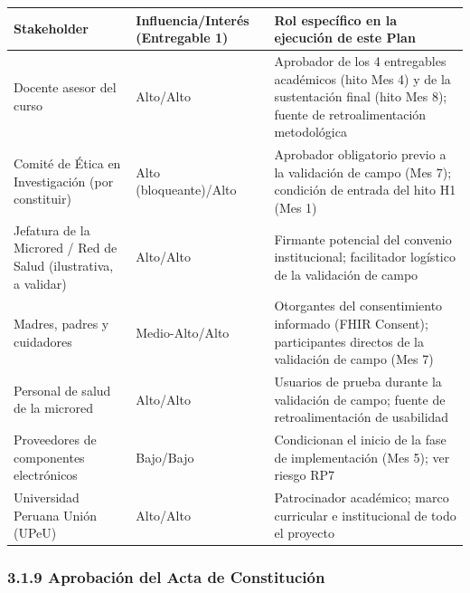 \documentclass[11pt,a4paper]{article}
\begin{document}
{\small
\begin{longtable}[]{@{}
  >{\raggedright\arraybackslash}p{}
  >{\raggedright\arraybackslash}p{}
  >{\raggedright\arraybackslash}p{}@{}}
\toprule\noalign{}
\begin{minipage}[b]{\linewidth}\raggedright
Stakeholder
\end{minipage} & \begin{minipage}[b]{\linewidth}\raggedright
Influencia/Interés (Entregable 1)
\end{minipage} & \begin{minipage}[b]{\linewidth}\raggedright
Rol específico en la ejecución de este Plan
\end{minipage} \\
\midrule\noalign{}
\endhead
\bottomrule\noalign{}
\endlastfoot
Docente asesor del curso & Alto/Alto & Aprobador de los 4 entregables académicos (hito Mes 4) y de la sustentación final (hito Mes 8); fuente de retroalimentación metodológica \\
Comité de Ética en Investigación (por constituir) & Alto (bloqueante)/Alto & Aprobador obligatorio previo a la validación de campo (Mes 7); condición de entrada del hito H1 (Mes 1) \\
Jefatura de la Microred / Red de Salud (ilustrativa, a validar) & Alto/Alto & Firmante potencial del convenio institucional; facilitador logístico de la validación de campo \\
Madres, padres y cuidadores & Medio-Alto/Alto & Otorgantes del consentimiento informado (FHIR Consent); participantes directos de la validación de campo (Mes 7) \\
Personal de salud de la microred & Alto/Alto & Usuarios de prueba durante la validación de campo; fuente de retroalimentación de usabilidad \\
Proveedores de componentes electrónicos & Bajo/Bajo & Condicionan el inicio de la fase de implementación (Mes 5); ver riesgo RP7 \\
Universidad Peruana Unión (UPeU) & Alto/Alto & Patrocinador académico; marco curricular e institucional de todo el proyecto \\
\end{longtable}
}

\subsubsection{3.1.9 Aprobación del Acta de Constitución}\label{aprobaciuxf3n-del-acta-de-constituciuxf3n}
\end{document}
